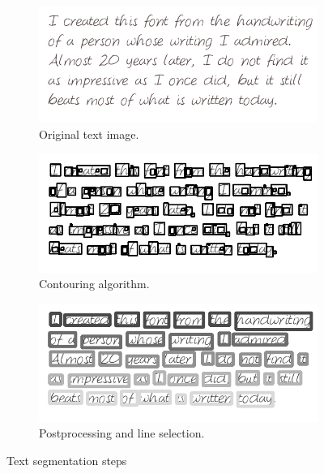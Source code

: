 \documentclass{article}
\begin{document}
\begin{figure}
    \begin{subfigure}{\linewidth}
    \centering
    \includegraphics[width=.7\linewidth]{images/text}
    \vspace{-5px}
    \caption*{Original text image.}
    \end{subfigure}
    \begin{subfigure}{\linewidth}
    \centering
    \includegraphics[width=.7\linewidth]{images/cont}
    \vspace{-5px}
    \caption*{Contouring algorithm.}
    \end{subfigure}
    \begin{subfigure}{\linewidth}
    \centering
    \includegraphics[width=.7\linewidth]{images/lines}
    \vspace{-5px}
    \caption*{Postprocessing and line selection.}
    \end{subfigure}
    \vspace{-10px}
    \caption{Text segmentation steps}
    \label{fig:text_segm}
    \vspace{-20px}
\end{figure}
\end{document}
